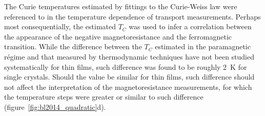 The Curie temperatures estimated by fittings to the Curie-Weiss law were referenced to in the temperature dependence of transport measurements. Perhaps most consequentially, the estimated $T_C$ was used to infer a correlation between the appearance of the negative magnetoresistance and the ferromagnetic transition. While the difference between the $T_C$ estimated in the paramagnetic r\'egime and that measured by thermodynamic techniques have not been studied systematically for thin films, such difference was found to be roughly \SI{2}{K} for single crystals. Should the value be similar for thin films, such difference should not affect the interpretation of the magnetoresistance measurements, for which the temperature steps were greater or similar to such difference (figure~\ref{fig:bl2014_quadratic}d).